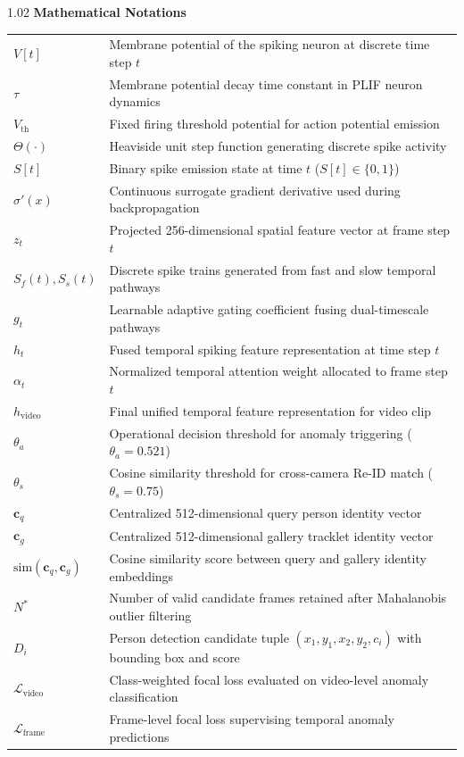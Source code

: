 \begin{spacing}{1.02}
\vspace{6pt}
\noindent \textbf{Mathematical Notations}
\nopagebreak[4]
\vspace{4pt}
\nopagebreak[4]

\noindent\begin{tabular*}{\textwidth}{@{\extracolsep{\fill}}p{2.8cm} p{11.2cm}@{}}
$V[t]$ & Membrane potential of the spiking neuron at discrete time step $t$ \\
$\tau$ & Membrane potential decay time constant in PLIF neuron dynamics \\
$V_{\text{th}}$ & Fixed firing threshold potential for action potential emission \\
$\Theta(\cdot)$ & Heaviside unit step function generating discrete spike activity \\
$S[t]$ & Binary spike emission state at time $t$ ($S[t] \in \{0, 1\}$) \\
$\sigma'(x)$ & Continuous surrogate gradient derivative used during backpropagation \\
$z_t$ & Projected 256-dimensional spatial feature vector at frame step $t$ \\
$S_f(t), S_s(t)$ & Discrete spike trains generated from fast and slow temporal pathways \\
$g_t$ & Learnable adaptive gating coefficient fusing dual-timescale pathways \\
$h_t$ & Fused temporal spiking feature representation at time step $t$ \\
$\alpha_t$ & Normalized temporal attention weight allocated to frame step $t$ \\
$h_{\text{video}}$ & Final unified temporal feature representation for video clip \\
$\theta_a$ & Operational decision threshold for anomaly triggering ($\theta_a = 0.521$) \\
$\theta_s$ & Cosine similarity threshold for cross-camera Re-ID match ($\theta_s = 0.75$) \\
$\mathbf{c}_q$ & Centralized 512-dimensional query person identity vector \\
$\mathbf{c}_g$ & Centralized 512-dimensional gallery tracklet identity vector \\
$\text{sim}(\mathbf{c}_q, \mathbf{c}_g)$ & Cosine similarity score between query and gallery identity embeddings \\
$N^*$ & Number of valid candidate frames retained after Mahalanobis outlier filtering \\
$D_i$ & Person detection candidate tuple $(x_1, y_1, x_2, y_2, c_i)$ with bounding box and score \\
$\mathcal{L}_{\text{video}}$ & Class-weighted focal loss evaluated on video-level anomaly classification \\
$\mathcal{L}_{\text{frame}}$ & Frame-level focal loss supervising temporal anomaly predictions \\
\end{tabular*}
\end{spacing}

\thispagestyle{plain}
